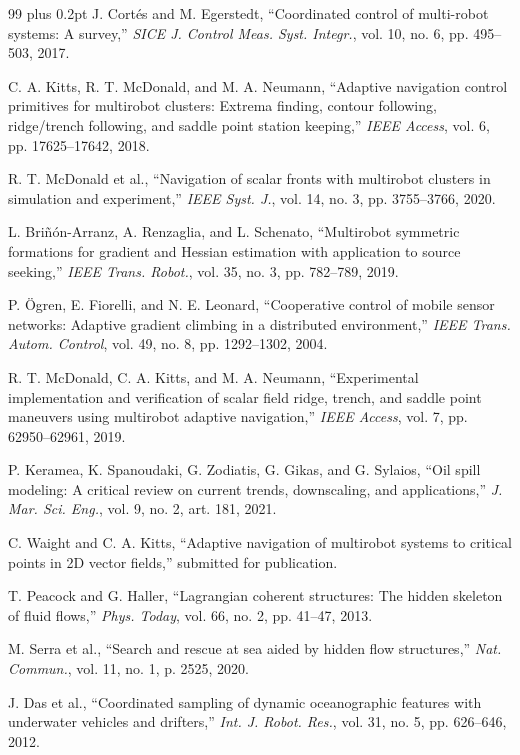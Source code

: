 \documentclass[lettersize,journal]{IEEEtran}
\begin{document}
\begin{thebibliography}{99}
\itemsep 0pt plus 0.2pt
\parskip 0pt
 J. Cortés and M. Egerstedt, ``Coordinated control of multi-robot
systems: A survey,'' \textit{SICE J. Control Meas. Syst. Integr.},
vol. 10, no. 6, pp. 495--503, 2017.

 C. A. Kitts, R. T. McDonald, and M. A. Neumann, ``Adaptive
navigation control primitives for multirobot clusters: Extrema finding,
contour following, ridge/trench following, and saddle point station keeping,''
\textit{IEEE Access}, vol. 6, pp. 17625--17642, 2018.

 R. T. McDonald et al., ``Navigation of
scalar fronts with multirobot clusters in simulation and experiment,''
\textit{IEEE Syst. J.}, vol. 14, no. 3, pp. 3755--3766, 2020.

 L. Briñón-Arranz, A. Renzaglia, and L. Schenato, ``Multirobot
symmetric formations for gradient and Hessian estimation with application to
source seeking,'' \textit{IEEE Trans. Robot.}, vol. 35, no. 3,
pp. 782--789, 2019.

 P. Ögren, E. Fiorelli, and N. E. Leonard, ``Cooperative control
of mobile sensor networks: Adaptive gradient climbing in a distributed
environment,'' \textit{IEEE Trans. Autom. Control}, vol. 49, no. 8,
pp. 1292--1302, 2004.

 R. T. McDonald, C. A. Kitts, and M. A. Neumann, ``Experimental
implementation and verification of scalar field ridge, trench, and saddle
point maneuvers using multirobot adaptive navigation,'' \textit{IEEE Access},
vol. 7, pp. 62950--62961, 2019.

 P. Keramea, K. Spanoudaki, G. Zodiatis, G. Gikas, and
G. Sylaios, ``Oil spill modeling: A critical review on current trends,
downscaling, and applications,'' \textit{J. Mar. Sci. Eng.}, vol. 9,
no. 2, art. 181, 2021.

 C. Waight and C. A. Kitts, ``Adaptive navigation of multirobot
systems to critical points in 2D vector fields,'' submitted for publication.

 T. Peacock and G. Haller, ``Lagrangian coherent structures: The
hidden skeleton of fluid flows,'' \textit{Phys. Today}, vol. 66, no. 2,
pp. 41--47, 2013.

 M. Serra et al., ``Search and rescue at sea aided by hidden flow
structures,'' \textit{Nat. Commun.}, vol. 11, no. 1, p. 2525, 2020.

 J. Das et al., ``Coordinated sampling of dynamic oceanographic
features with underwater vehicles and drifters,'' \textit{Int. J. Robot.
Res.}, vol. 31, no. 5, pp. 626--646, 2012.


\end{thebibliography}
\end{document}
